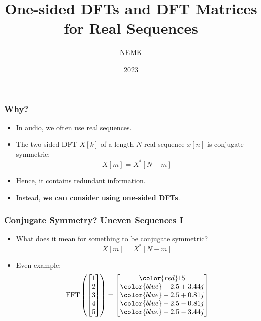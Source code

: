 \documentclass{beamer}
\title{One-sided DFTs and DFT Matrices for Real Sequences}
\author{NEMK}
\date{2023}
\begin{document}
\frame{\titlepage}

\begin{frame}
\frametitle{Why?}
\begin{itemize}
    \item In audio, we often use real sequences.
    \item The two-sided DFT $X[k]$ of a length-$N$ real sequence $x[n]$ is conjugate symmetric:
    \begin{equation}
        X[m] = X^*[N - m] 
    \end{equation}
    \item Hence, it contains redundant information. 
    \item Instead, \textbf{we can consider using one-sided DFTs}.
\end{itemize}
\end{frame}

\begin{frame}
\frametitle{Conjugate Symmetry? Uneven Sequences I}
\begin{itemize}
    \item What does it mean for something to be conjugate symmetric?
    \begin{equation*}
        X[m] = X^*[N - m] 
    \end{equation*}
    \item Even example:
        \begin{equation}
        \textrm{FFT}\left(\begin{bmatrix}1 \\ 2 \\ 3 \\ 4 \\ 5 \end{bmatrix}\right) = 
        \begin{bmatrix}
           {\color{red}15} \\ {\color{blue}-2.5+3.44j} \\ {\color{blue}-2.5+0.81j} \\
           {\color{blue}-2.5-0.81j} \\ {\color{blue}-2.5-3.44j}
        \end{bmatrix}
        \end{equation}
\end{itemize}
\end{frame}
\end{document}
